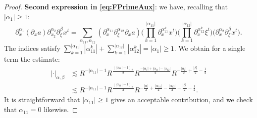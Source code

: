 \documentclass{amsart}
\theoremstyle{definition}
\begin{document}
\begin{proof}
\textbf{Second expression in \eqref{eq:FPrimeAux}}: we have, recalling that $|\alpha_1| \geq 1$:
\begin{equation*}
    \partial_x^{\alpha_1} (\partial_x a) \partial_{x_2}^{\alpha_2} \partial_{\xi}^{\beta} x^t = \sum_{\alpha_{11},\alpha_{12}} (\partial_{x}^{\alpha_{11}} \partial_{\xi}^{\alpha_{12}} \partial_x a) \big( \prod_{k=1}^{|\alpha_{11}|} \partial_{x}^{\alpha_{11}^k} x^t \big) \big( \prod_{k=1}^{|\alpha_{12}|} \partial_x^{\alpha_{12}^k} \xi^t \big) \big( \partial_x^{\alpha_2} \partial_{\xi}^{\beta} x^t \big).
\end{equation*}
The indices satisfy $\sum_{k=1}^{|\alpha_{11}|} |\alpha_{11}^k| + \sum_{k=1}^{|\alpha_{12}|} |\alpha_{12}^k| = |\alpha_1| \geq 1$. 
We obtain for a single term the estimate:
\begin{equation*}
\begin{split}
 |\cdot|_{\alpha,\beta} &\lesssim R^{-|\alpha_{11}|-1} R^{\frac{(|\alpha_{11}|-1)_+}{2}} R^{\frac{-|\alpha_1|+|\alpha_{11}|-|\alpha_{12}|}{2}} R^{-\frac{|\alpha_2|}{2}+\frac{|\beta|}{2}-\frac{1}{2}} \\
 &\lesssim R^{-|\alpha_{11}|-1} R^{\frac{(|\alpha_{11}|-1)_+}{2}} R^{-\frac{|\alpha|}{2}+\frac{|\alpha_{11}|}{2}-\frac{|\alpha_{12}|}{2}+\frac{|\beta|}{2}-\frac{1}{2}}.
 \end{split}
\end{equation*}
It is straightforward that $|\alpha_{11}| \geq 1$ gives an acceptable contribution, and we check that $\alpha_{11} = 0$ likewise.


\end{proof}
\end{document}
